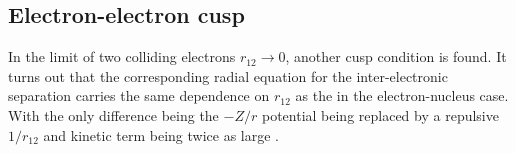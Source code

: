 \documentclass[../../master.tex]{subfiles}
\begin{document}


\subsection{Electron-electron cusp \label{section:eecusp}}
In the limit of two colliding electrons $r_{12}\rightarrow 0$, another cusp condition is found. It turns out that the corresponding radial equation for the inter-electronic separation carries the same dependence on $r_{12}$ as the in the electron-nucleus case. With the only difference being the $-Z/r$ potential being replaced by a repulsive $1/r_{12}$ and kinetic term being twice as large \cite{thijssen}. 
\end{document}
